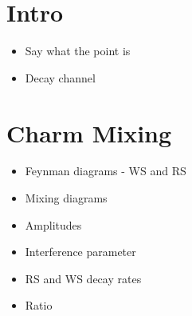 \documentclass[note.tex]{subfiles}
\begin{document}
\section{Intro}
\begin{itemize}
    \item Say what the point is
    \item Decay channel
\end{itemize}

\section{Charm Mixing}
\begin{itemize}
    \item Feynman diagrams - WS and RS
    \item Mixing diagrams
    \item Amplitudes
    \item Interference parameter
    \item RS and WS decay rates
    \item Ratio
\end{itemize}
\end{document}
